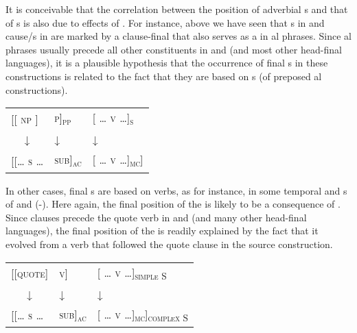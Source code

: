\documentclass[output=paper]{langsci/langscibook}
\begin{document}
It is conceivable that the correlation between the position of adverbial s and that of s is also due to  effects of . For instance, above we have seen that s in  and cause/s in  are marked by a clause-final  that also serves as a   in al phrases. Since al phrases usually precede all other constituents in  and  (and most other head-final languages), it is a plausible hypothesis that the occurrence of final s in these constructions is related to the fact that they are based on s (of preposed al constructions). 

\ea\label{ex:diessel:19}
\begin{tabular}[t]{@{}l@{ }ll@{}}
{[[ \textsc{np} ]}  &   {\textsc{p]\textsubscript{pp}}} & {[ \textsc{… v …]\textsubscript{s}}} \\
\multicolumn{1}{c}{↓}  & ↓ & {[ \textsc{… }}↓\\
{[\textsc{[… s …}} & {\textsc{sub]\textsubscript{ac}}} &  {[ \textsc{… v …]\textsubscript{mc}}]}\\
\end{tabular}
\z

In other cases, final s are based on  verbs, as for instance, in some temporal and s of  and  (-). Here again, the final position of the  is likely to be a consequence of . Since  clauses precede the quote verb in  and  (and many other head-final languages), the final position of the  is readily explained by the fact that it evolved from a  verb that followed the quote clause in the source construction. 

\ea\label{ex:diessel:20}
\begin{tabular}[t]{@{}l@{ }ll@{}}
{[\textsc{[quote]}} &   {\textsc{v]}}  & {[ \textsc{… v …]\textsubscript{simple S}}}\\
\multicolumn{1}{c}{↓}  & ↓ & {[ \textsc{… }}↓\\
{[[\textsc{… s …}} & {\textsc{sub]\textsubscript{ac}}} &  {[ \textsc{… v …]\textsubscript{mc}]\textsubscript{complex S}}}\\
\end{tabular}
\z
\end{document}
